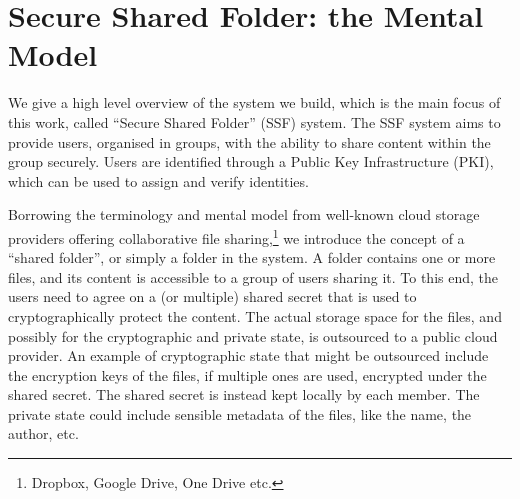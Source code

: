 

\section{Secure Shared Folder: the Mental Model}\label{sc:mental-model}

We give a high level overview of the system we build,
which is the main focus of this work, 
called ``Secure Shared Folder'' (SSF) system.
The SSF system aims to provide users, organised in groups, 
with the ability to share content within the group securely.
Users are identified through a Public Key Infrastructure (PKI),
which can be used to assign and verify identities.

Borrowing the terminology and mental model from well-known cloud storage providers offering collaborative file sharing,\footnote{Dropbox, Google Drive, One Drive etc.}
we introduce the concept of a ``shared folder'', or simply a folder in the system.
A folder contains one or more files, and its content is accessible to a group of users sharing it.
To this end, the users need to agree on a (or multiple) shared secret that is used to cryptographically protect the content.
The actual storage space for the files, and possibly for the cryptographic and private state, is outsourced to a public cloud provider.
An example of cryptographic state that might be outsourced include the encryption keys of the files, if multiple ones are used, encrypted under the
shared secret. The shared secret is instead kept locally by each member. The private state could include sensible metadata of the files,
like the name, the author, etc.

